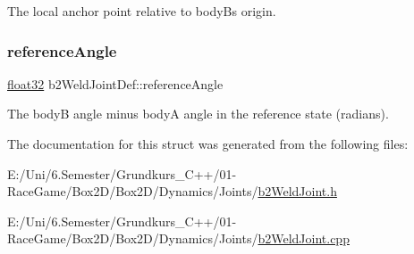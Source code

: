 The local anchor point relative to bodyB\textquotesingle{}s origin. 

\mbox{\label{structb2_weld_joint_def_a31aeb208f15842091c55e3f1bab6d8f1}} 
\subsubsection{\texorpdfstring{referenceAngle}{referenceAngle}}
{\footnotesize\ttfamily \mbox{\hyperlink{b2_settings_8h_aacdc525d6f7bddb3ae95d5c311bd06a1}{float32}} b2\+Weld\+Joint\+Def\+::reference\+Angle}



The bodyB angle minus bodyA angle in the reference state (radians). 



The documentation for this struct was generated from the following files\+:\begin{DoxyCompactItemize}
\item 
E\+:/\+Uni/6.\+Semester/\+Grundkurs\+\_\+\+C++/01-\/\+Race\+Game/\+Box2\+D/\+Box2\+D/\+Dynamics/\+Joints/\mbox{\hyperlink{b2_weld_joint_8h}{b2\+Weld\+Joint.\+h}}\item 
E\+:/\+Uni/6.\+Semester/\+Grundkurs\+\_\+\+C++/01-\/\+Race\+Game/\+Box2\+D/\+Box2\+D/\+Dynamics/\+Joints/\mbox{\hyperlink{b2_weld_joint_8cpp}{b2\+Weld\+Joint.\+cpp}}\end{DoxyCompactItemize}
